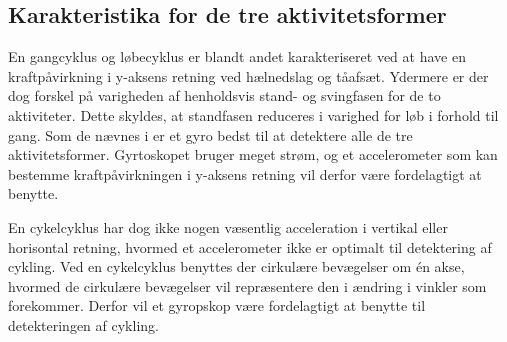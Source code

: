 

\subsection{Karakteristika for de tre aktivitetsformer}
En gangcyklus og løbecyklus er blandt andet karakteriseret ved at have en kraftpåvirkning i y-aksens retning ved hælnedslag og tåafsæt. Ydermere er der dog forskel på varigheden af henholdsvis stand- og svingfasen for de to aktiviteter. Dette skyldes, at standfasen reduceres i varighed for løb i forhold til gang. \newline
Som de nævnes i  er et gyro bedst til at detektere alle de tre aktivitetsformer. Gyrtoskopet bruger meget strøm, og et accelerometer som kan bestemme kraftpåvirkningen i y-aksens retning vil derfor være fordelagtigt at benytte. \citep{Lee1998,Rueterbories2010}

En cykelcyklus har dog ikke nogen væsentlig acceleration i vertikal eller horisontal retning, hvormed et accelerometer ikke er optimalt til detektering af cykling. Ved en cykelcyklus benyttes der cirkulære bevægelser om én akse, hvormed de cirkulære bevægelser vil repræsentere den i ændring i vinkler som forekommer. Derfor vil et gyropskop være fordelagtigt at benytte til detekteringen af cykling. \citep{Cockcroft2011,Marin-PerianuMarin-Perianu2013}


